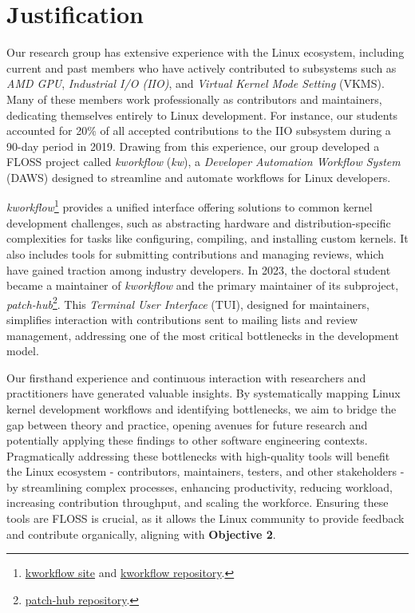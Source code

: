 \section{Justification}
\label{chp:justification}

Our research group has extensive experience with the Linux ecosystem, including current and past members who have actively contributed to subsystems such as \textit{AMD GPU}, \textit{Industrial I/O (IIO)}, and \textit{Virtual Kernel Mode Setting} (VKMS). Many of these members work professionally as contributors and maintainers, dedicating themselves entirely to Linux development. For instance, our students accounted for 20\% of all accepted contributions to the IIO subsystem during a 90-day period in 2019. Drawing from this experience, our group developed a FLOSS project called \textit{kworkflow} (\textit{kw}), a \textit{Developer Automation Workflow System} (DAWS) designed to streamline and automate workflows for Linux developers.

\textit{kworkflow}\footnote{\href{https://kworkflow.org}{kworkflow site} and \href{https://github.com/kworkflow/kworkflow/}{kworkflow repository}.} provides a unified interface offering solutions to common kernel development challenges, such as abstracting hardware and distribution-specific complexities for tasks like configuring, compiling, and installing custom kernels. It also includes tools for submitting contributions and managing reviews, which have gained traction among industry developers. In 2023, the doctoral student became a maintainer of \textit{kworkflow} and the primary maintainer of its subproject, \textit{patch-hub}\footnote{\href{https://github.com/kworkflow/patch-hub/}{patch-hub repository}.}. This \textit{Terminal User Interface} (TUI), designed for maintainers, simplifies interaction with contributions sent to mailing lists and review management, addressing one of the most critical bottlenecks in the development model.

Our firsthand experience and continuous interaction with researchers and practitioners have generated valuable insights. By systematically mapping Linux kernel development workflows and identifying bottlenecks, we aim to bridge the gap between theory and practice, opening avenues for future research and potentially applying these findings to other software engineering contexts. Pragmatically addressing these bottlenecks with high-quality tools will benefit the Linux ecosystem - contributors, maintainers, testers, and other stakeholders - by streamlining complex processes, enhancing productivity, reducing workload, increasing contribution throughput, and scaling the workforce. Ensuring these tools are FLOSS is crucial, as it allows the Linux community to provide feedback and contribute organically, aligning with \textbf{Objective 2}.

